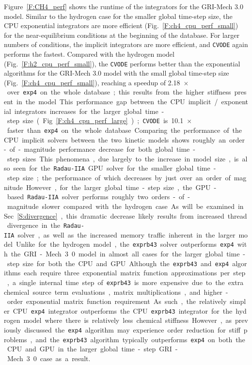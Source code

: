 \documentclass[preprint,review,11pt]{elsarticle}
\begin{document}
Figure~\ref{F:CH4_perf} shows the runtime of the integrators for the GRI-Mech 3.0 model.
Similar to the hydrogen case for the smaller global time-step size, the CPU exponential integrators are more efficient (Fig.~\ref{F:ch4_cpu_perf_small}) for the near-equilibrium conditions at the beginning of the database.
For larger numbers of conditions, the implicit integrators are more efficient, and \texttt{CVODE} again performs the fastest.
Compared with the hydrogen model (Fig.~\ref{F:h2_cpu_perf_small}), the \texttt{CVODE} performs better than the exponential algorithms for the GRI-Mech 3.0 model with the small global time-step size (Fig.~\ref{F:ch4_cpu_perf_small}), reaching a speedup of \SI{2.18}{$\times$} over \texttt{exp4} on the whole database; this results from the higher stiffness present in the model.
This performance gap between the CPU implicit\slash exponential integrators increases for the larger global time-step size (Fig.~\ref{F:ch4_cpu_perf_large}); \texttt{CVODE} is \SI{10.1}{$\times$} faster than \texttt{exp4} on the whole database.
Comparing the performance of the CPU implicit solvers between the two kinetic models shows roughly an order-of-magnitude performance decrease for both global time-step sizes.
This phenomena, due largely to the increase in model size, is also seen for the \texttt{Radau-IIA} GPU solver for the smaller global time-step size; the performance of which decreases by just over an order of magnitude.
However, for the larger global time-step size, the GPU-based \texttt{Radau-IIA} solver performs roughly two orders-of-magnitude slower compared with the hydrogen case.
As will be examined in Sec.~\ref{S:divergence}, this dramatic decrease likely results from increased thread divergence in the \texttt{Radau-IIA} solver, as well as the increased memory traffic inherent in the larger model.

Unlike for the hydrogen model, the \texttt{exprb43} solver outperforms \texttt{exp4} with the GRI-Mech 3.0 model in almost all cases for the larger global time-step size for both the CPU and GPU.
Although the \texttt{exprb43} and \texttt{exp4} algorithms each require three exponential matrix function approximations per step, a single internal time step of \texttt{exprb43} is more expensive due to the extra chemical source term evaluations, matrix multiplications, and higher-order exponential matrix function requirement.
As such, the relatively simpler CPU \texttt{exp4} integrator outperforms the CPU \texttt{exprb43} integrator for the hydrogen model where there is relatively less chemical stiffness.
However, as previously discussed the \texttt{exp4} algorithm may experience order reduction for stiff problems, and the \texttt{exprb43} algorithm typically outperforms \texttt{exp4} on both the CPU and GPU in the larger global time-step GRI-Mech 3.0 case as a result.
\end{document}
